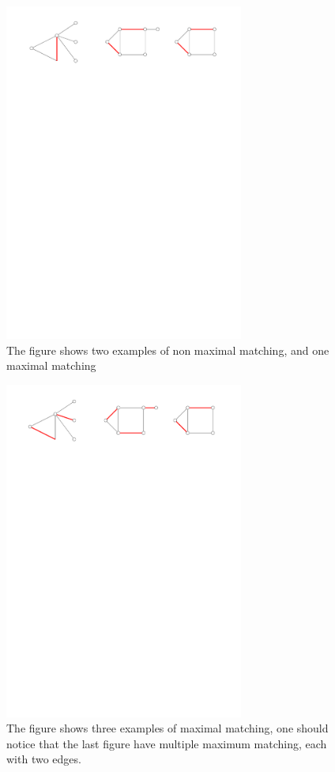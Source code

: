 \begin{figure}[H]
	\centering
	\includegraphics[width=0.7\textwidth]{figures/imperfectmatching.pdf}
	\caption{The figure shows two examples of non maximal matching, and one maximal matching \cite{wiki:maximalmatching}}
	\label{fig:imperfectmatching}
\end{figure}

\begin{figure}[H]
	\centering
	\includegraphics[width=0.7\textwidth]{figures/perfectmatching.pdf}
	\caption{The figure shows three examples of maximal matching, one should notice that the last 
    		 figure have multiple maximum matching, each with two edges\cite{wiki:maximalmatching}.}
	\label{fig:perfectmatching}
\end{figure}

